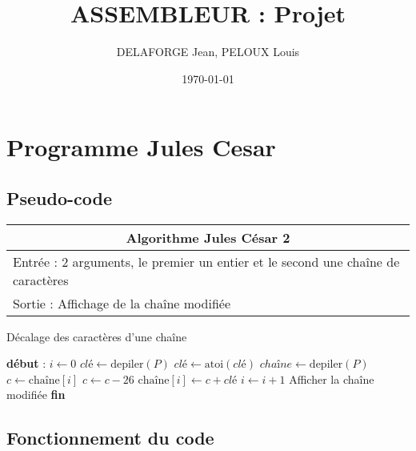 \documentclass[a4paper, 12pt]{article}
\title{ASSEMBLEUR : Projet}
\author{DELAFORGE Jean, PELOUX Louis}
\date{\today}
\begin{document}
\maketitle

\newpage

\tableofcontents

\newpage




\section{Programme Jules Cesar}

\subsection{Pseudo-code}

\begin{center}
  \begin{tabular}{|l|}
    \hline
    \multicolumn{1}{|c|}{ Algorithme Jules César 2} \\
    \hline
    Entrée : 2 arguments, le premier un entier et le second une chaîne de caractères  \\
    \hline
    Sortie : Affichage de la chaîne modifiée \\
    \hline
  \end{tabular}
\end{center}

\begin{algorithm}
\caption{Décalage des caractères d'une chaîne}
\begin{algorithmic}[1]
\State \textbf{début} :
\State $i \leftarrow 0$
\State $clé \leftarrow \text{depiler}(P)$
\State $clé \leftarrow \text{atoi}(clé)$
\State $chaîne \leftarrow \text{depiler}(P)$
    \State $c \leftarrow \text{chaîne}[i]$
        \State $c \leftarrow c - 26$
    \EndWhile
    \State $\text{chaîne}[i] \leftarrow c + clé$
    \State $i \leftarrow i + 1$
\EndWhile
\State Afficher la chaîne modifiée
\State \textbf{fin}
\end{algorithmic}
\end{algorithm}


\subsection{Fonctionnement du code}
\end{document}
